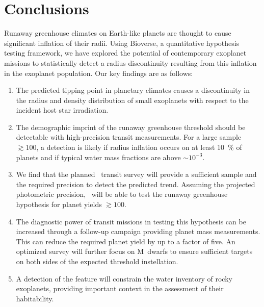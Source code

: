 \documentclass[twocolumn]{aastex631}
\begin{document}
\section{Conclusions}
Runaway greenhouse climates on Earth-like planets are thought to cause significant inflation of their radii.
Using Bioverse, a quantitative hypothesis testing framework, we have explored the potential of contemporary exoplanet missions to statistically detect a radius discontinuity resulting from this inflation in the exoplanet population.
Our key findings are as follows:
\begin{enumerate}
    \item The predicted tipping point in planetary climates causes a discontinuity in the radius and density distribution of small exoplanets with respect to the incident host star irradiation.
    \item The demographic imprint of the runaway greenhouse threshold should be detectable with high-precision transit measurements. For a large sample $\gtrsim 100$, a detection is likely if radius inflation occurs on at least \SI{10}{\percent} of planets and if typical water mass fractions are above $\sim 10^{-3}$.
    \item We find that the planned \plato\ transit survey will provide a sufficient sample and the required precision to detect the predicted trend. Assuming the projected photometric precision, \plato\ will be able to test the runaway greenhouse hypothesis for planet yields $\gtrsim 100$.
    \item The diagnostic power of transit missions in testing this hypothesis can be increased through a follow-up campaign providing planet mass measurements. This can reduce the required planet yield by up to a factor of five. An optimized survey will further focus on M~dwarfs to ensure sufficient targets on both sides of the expected threshold instellation.
    \item A detection of the feature will constrain the water inventory of rocky exoplanets, providing important context in the assessment of their habitability.
\end{enumerate}


\end{document}
